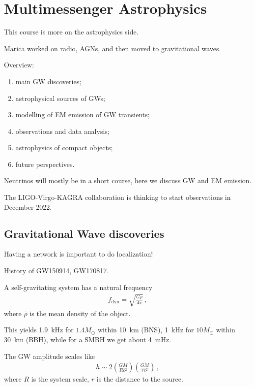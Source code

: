 \documentclass[main.tex]{subfiles}
\begin{document}
\section{Multimessenger Astrophysics}


This course is more on the astrophysics side. 

Marica worked on radio, AGNs, and then moved to gravitational waves. 

Overview: 
\begin{enumerate}
    \item main GW discoveries;
    \item astrophysical sources of GWs;
    \item modelling of EM emission of GW transients;
    \item observations and data analysis;
    \item astrophysics of compact objects;
    \item future perspectives.
\end{enumerate}

Neutrinos will mostly be in a short course, here we discuss GW and EM emission. 

The LIGO-Virgo-KAGRA collaboration is thinking to start observations in December 2022. 

\subsection{Gravitational Wave discoveries}

Having a network is important to do localization! 

History of GW150914, GW170817. 

A self-gravitating system has a natural frequency 
%
\begin{align}
f _{\text{dyn}} = \sqrt{\frac{G \overline{\rho}}{4 \pi }}
\,,
\end{align}
%
where \(\overline{\rho}\) is the mean density of the object. 

This yields \SI{1.9}{kHz} for \(1.4M_{\odot}\) within \SI{10}{km} (BNS), 
\SI{1}{kHz} for \(10M_{\odot}\) within \SI{30}{km} (BBH), 
while for a SMBH we get about \SI{4}{mHz}. 

The GW amplitude scales like 
%
\begin{align}
h \sim 2 \left(\frac{GM}{Rc^2}\right)
\left(\frac{GM}{rc^2}\right)
\,,
\end{align}
%
where \(R\) is the system scale, \(r\) is the distance to the source. 
\end{document}
